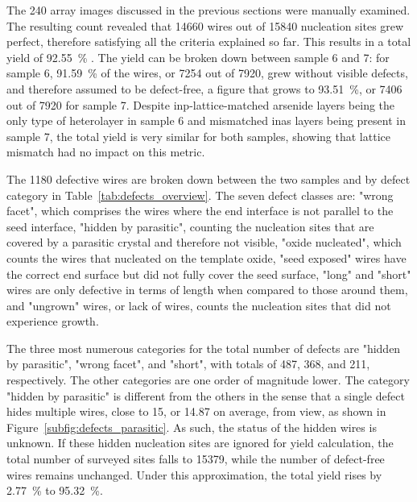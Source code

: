 The \num{240} array images discussed in the previous sections were manually examined. The resulting count revealed that \num{14660} wires out of \num{15840} nucleation sites grew perfect, therefore satisfying all the criteria explained so far. This results in a total yield of \qty{92.55}{\percent} \cite{Brugnolotto2023_2}. The yield can be broken down between sample 6 and 7: for sample 6, \qty{91.59}{\percent} of the wires, or \num{7254} out of \num{7920}, grew without visible defects, and therefore assumed to be defect-free, a figure that grows to \qty{93.51}{\percent}, or \num{7406} out of \num{7920} for sample 7. Despite \acs{inp}-lattice-matched arsenide layers being the only type of heterolayer in sample 6 and mismatched \acf{inas} layers being present in sample 7, the total yield is very similar for both samples, showing that lattice mismatch had no impact on this metric.

The \num{1180} defective wires are broken down between the two samples and by defect category in Table~\ref{tab:defects_overview}. The seven defect classes are: "wrong facet", which comprises the wires where the end interface is not parallel to the  seed interface, "hidden by parasitic", counting the nucleation sites that are covered by a parasitic crystal and therefore not visible, "oxide nucleated", which counts the wires that nucleated on the template oxide, "seed exposed" wires have the correct end surface but did not fully cover the seed surface, "long" and "short" wires are only defective in terms of length when compared to those around them, and "ungrown" wires, or lack of wires, counts the nucleation sites that did not experience growth.

The three most numerous categories for the total number of defects are "hidden by parasitic", "wrong facet", and "short", with totals of \num{487}, \num{368}, and \num{211}, respectively. The other categories are one order of magnitude lower. The category "hidden by parasitic" is different from the others in the sense that a single defect hides multiple wires, close to \num{15}, or \num{14.87} on average, from view, as shown in Figure~\ref{subfig:defects_parasitic}. As such, the status of the hidden wires is unknown. If these hidden nucleation sites are ignored for yield calculation, the total number of surveyed sites falls to \num{15379}, while the number of defect-free wires remains unchanged. Under this approximation, the total yield rises by \qty{2.77}{\percent} to \qty{95.32}{\percent}.


